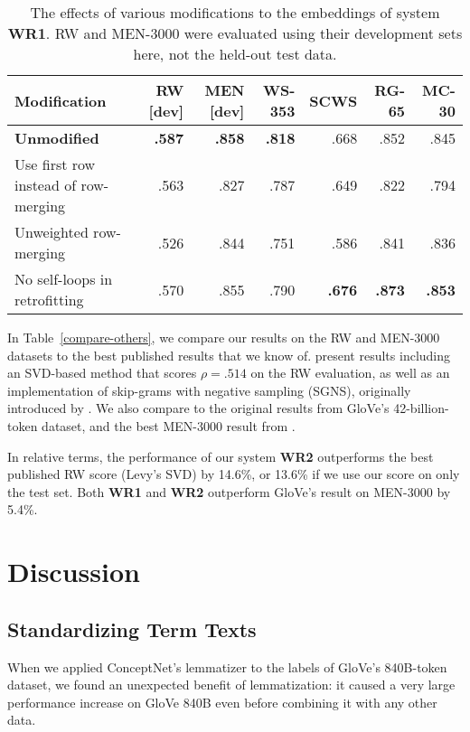 \documentclass[11pt,letterpaper]{article}
\begin{document}
\begin{table*}[t]
\centering
\begin{tabular}{lrrrrrr}
\toprule
Modification & RW [dev] & MEN [dev] & WS-353 & SCWS &  RG-65 &  MC-30 \\
\midrule
{\bf Unmodified}                     & \bf .587 & \bf .858 & \bf .818 &  .668 &   .852 &   .845 \\
Use first row instead of row-merging & .563 &      .827 &    .787 &  .649 &   .822 &   .794 \\
Unweighted row-merging               & .526 &      .844 &    .751 &  .586 &   .841 &   .836 \\
No self-loops in retrofitting        & .570 &      .855 &    .790 & \bf .676 & \bf .873 & \bf .853 \\
\bottomrule
\end{tabular}
\caption{
    The effects of various modifications to the embeddings of system {\bf WR1}.
    RW and MEN-3000 were evaluated using their development sets here,
    not the held-out test data.
}
\label{eval-variations}
\end{table*}

In Table~\ref{compare-others}, we compare our results on the RW and MEN-3000
datasets to the best published results that we know of.
 present results including an SVD-based method
that scores $\rho = .514$ on the RW evaluation, as well as an implementation
of skip-grams with negative sampling (SGNS), originally introduced by
. We also compare to the original results from
GloVe's 42-billion-token dataset, and the best MEN-3000 result from
.

In relative terms, the performance of our system {\bf WR2} outperforms the best
published RW score (Levy's SVD) by 14.6\%, or 13.6\% if we use our score on only
the test set. Both {\bf WR1} and {\bf WR2} outperform GloVe's result on
MEN-3000 by 5.4\%.

\section{Discussion}

\subsection{Standardizing Term Texts}

When we applied ConceptNet's lemmatizer to the labels of GloVe's 840B-token
dataset, we found an unexpected benefit of lemmatization: it caused a very
large performance increase on GloVe 840B even before combining it with any
other data.
\end{document}
